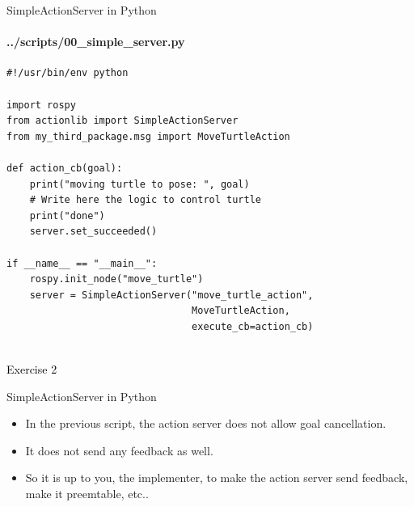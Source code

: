 \documentclass{beamer}
\begin{document}
\begin{frame}[fragile]{SimpleActionServer in Python}
    \framesubtitle{   ../scripts/00\_simple\_server.py}
    \begin{lstlisting}
#!/usr/bin/env python

import rospy
from actionlib import SimpleActionServer
from my_third_package.msg import MoveTurtleAction

def action_cb(goal):
    print("moving turtle to pose: ", goal)
    # Write here the logic to control turtle
    print("done")
    server.set_succeeded()

if __name__ == "__main__":
    rospy.init_node("move_turtle")
    server = SimpleActionServer("move_turtle_action", 
                                MoveTurtleAction,
                                execute_cb=action_cb)
    
    \end{lstlisting}
\end{frame}



\begin{frame}[plain]{}  
    \centering
    {\huge \textcolor{black}{Exercise 2}}
\end{frame}


\begin{frame}{SimpleActionServer in Python}
   
    \begin{itemize} 
         
        \item In the previous script, the action server does not allow goal cancellation.
        
        \vspace{5mm}
        
        \item It does not send any feedback as well.
        
        \vspace{5mm}
        
        \item So it is up to you, the implementer, to make the action server send feedback, make it preemtable, etc..
        
    \end{itemize}      
\end{frame}
\end{document}
